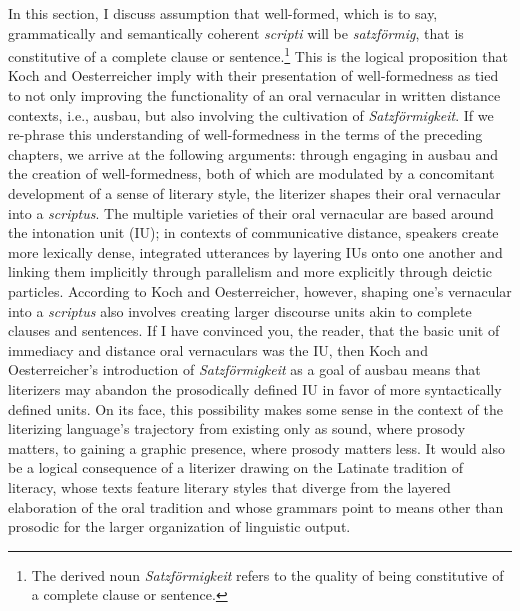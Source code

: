 In this section, I discuss  assumption that well-formed, which is to say, grammatically and semantically coherent \textit{scripti} will be \textit{satzförmig}, that is constitutive of a complete clause or sentence.\footnote{{The derived noun} {\textit{Satzförmigkeit}} {refers to the quality of being constitutive of a complete clause or sentence.} } This is the logical proposition that Koch and Oesterreicher imply with their presentation of well-formedness as tied to not only improving the functionality of an oral vernacular in written distance contexts, i.e., ausbau, but also involving the cultivation of \textit{Satzförmigkeit}. If we re-phrase this understanding of well-formedness in the terms of the preceding chapters, we arrive at the following arguments: through engaging in ausbau and the creation of well-formedness, both of which are modulated by a concomitant development of a sense of literary style, the literizer shapes their oral vernacular into a \textit{scriptus}. The multiple varieties of their oral vernacular are based around the intonation unit (IU); in contexts of communicative distance, speakers create more lexically dense, integrated utterances by layering IUs onto one another and linking them implicitly through parallelism and more explicitly through deictic particles. According to Koch and Oesterreicher, however, shaping one’s vernacular into a \textit{scriptus} also involves creating larger discourse units akin to complete clauses and sentences. If I have convinced you, the reader, that the basic unit of immediacy and distance oral vernaculars was the IU, then Koch and Oesterreicher’s introduction of \textit{Satzförmigkeit} as a goal of ausbau means that literizers may abandon the prosodically defined IU in favor of more syntactically defined units. On its face, this possibility makes some sense in the context of the literizing language’s trajectory from existing only as sound, where prosody matters, to gaining a graphic presence, where prosody matters less. It would also be a logical consequence of a literizer drawing on the Latinate tradition of literacy, whose texts feature literary styles that diverge from the layered elaboration of the oral tradition and whose grammars point to means other than prosodic for the larger organization of linguistic output.

